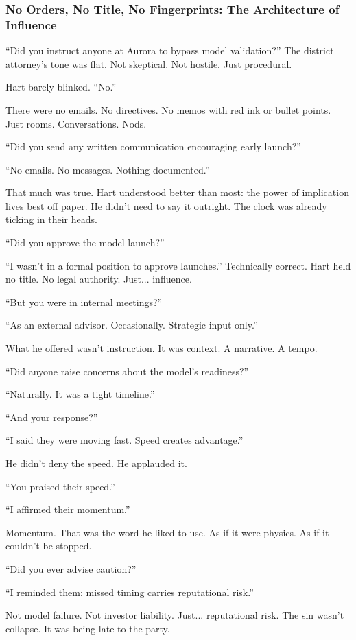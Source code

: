   \medskip

\subsubsection{No Orders, No Title, No Fingerprints: The Architecture of Influence}

“Did you instruct anyone at Aurora to bypass model validation?”
The district attorney's tone was flat. Not skeptical. Not hostile. Just procedural.

Hart barely blinked.
“No.”

There were no emails. No directives. No memos with red ink or bullet points.
Just rooms. Conversations. Nods.

“Did you send any written communication encouraging early launch?”

“No emails. No messages. Nothing documented.”

That much was true. Hart understood better than most: the power of implication lives best off paper.
He didn’t need to say it outright. The clock was already ticking in their heads.

“Did you approve the model launch?”

“I wasn’t in a formal position to approve launches.”
Technically correct. Hart held no title. No legal authority. Just... influence.

“But you were in internal meetings?”

“As an external advisor. Occasionally. Strategic input only.”

What he offered wasn’t instruction. It was context.
A narrative.
A tempo.

“Did anyone raise concerns about the model’s readiness?”

“Naturally. It was a tight timeline.”

“And your response?”

“I said they were moving fast. Speed creates advantage.”

He didn’t deny the speed.
He applauded it.

“You praised their speed.”

“I affirmed their momentum.”

Momentum. That was the word he liked to use. As if it were physics.
As if it couldn’t be stopped.

“Did you ever advise caution?”

“I reminded them: missed timing carries reputational risk.”

Not model failure. Not investor liability.
Just... reputational risk. The sin wasn’t collapse. It was being late to the party.

